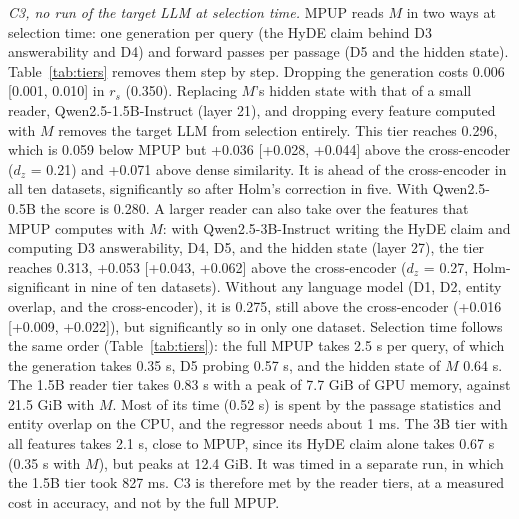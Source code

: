 \documentclass[conference]{IEEEtran}
\begin{document}
\textit{C3, no run of the target LLM at selection time.} MPUP reads $M$ in two ways at selection time: one generation per query (the HyDE claim behind D3 answerability and D4) and forward passes per passage (D5 and the hidden state). Table~\ref{tab:tiers} removes them step by step. Dropping the generation costs 0.006 [0.001, 0.010] in $r_s$ (0.350). Replacing $M$'s hidden state with that of a small reader, Qwen2.5-1.5B-Instruct (layer 21), and dropping every feature computed with $M$ removes the target LLM from selection entirely. This tier reaches 0.296, which is 0.059 below MPUP but +0.036 [+0.028, +0.044] above the cross-encoder ($d_z$ = 0.21) and +0.071 above dense similarity. It is ahead of the cross-encoder in all ten datasets, significantly so after Holm's correction in five. With Qwen2.5-0.5B the score is 0.280. A larger reader can also take over the features that MPUP computes with $M$: with Qwen2.5-3B-Instruct writing the HyDE claim and computing D3 answerability, D4, D5, and the hidden state (layer 27), the tier reaches 0.313, +0.053 [+0.043, +0.062] above the cross-encoder ($d_z$ = 0.27, Holm-significant in nine of ten datasets). Without any language model (D1, D2, entity overlap, and the cross-encoder), it is 0.275, still above the cross-encoder (+0.016 [+0.009, +0.022]), but significantly so in only one dataset. Selection time follows the same order (Table~\ref{tab:tiers}): the full MPUP takes 2.5 s per query, of which the generation takes 0.35 s, D5 probing 0.57 s, and the hidden state of $M$ 0.64 s. The 1.5B reader tier takes 0.83 s with a peak of 7.7 GiB of GPU memory, against 21.5 GiB with $M$. Most of its time (0.52 s) is spent by the passage statistics and entity overlap on the CPU, and the regressor needs about 1 ms. The 3B tier with all features takes 2.1 s, close to MPUP, since its HyDE claim alone takes 0.67 s (0.35 s with $M$), but peaks at 12.4 GiB. It was timed in a separate run, in which the 1.5B tier took 827 ms. C3 is therefore met by the reader tiers, at a measured cost in accuracy, and not by the full MPUP.
\end{document}
